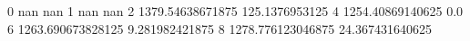 0 nan nan
1 nan nan
2 1379.54638671875 125.1376953125
4 1254.40869140625 0.0
6 1263.690673828125 9.281982421875
8 1278.776123046875 24.367431640625
